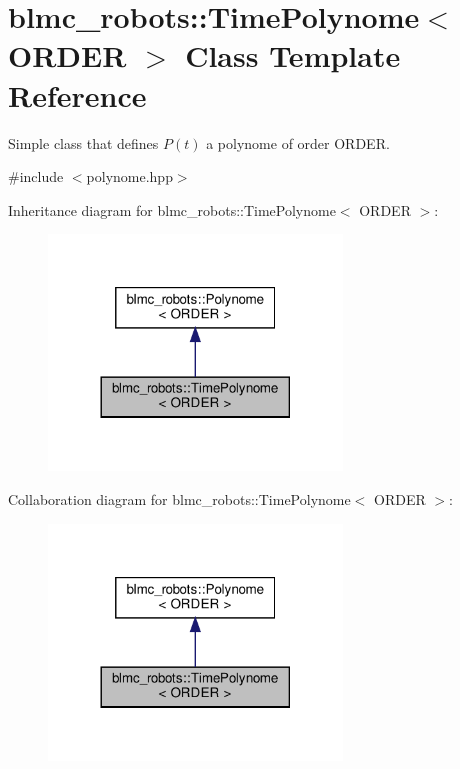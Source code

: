 \hypertarget{classblmc__robots_1_1TimePolynome}{}\section{blmc\+\_\+robots\+:\+:Time\+Polynome$<$ O\+R\+D\+ER $>$ Class Template Reference}
\label{classblmc__robots_1_1TimePolynome}


Simple class that defines $ P(t) $ a polynome of order O\+R\+D\+ER.  




{\ttfamily \#include $<$polynome.\+hpp$>$}



Inheritance diagram for blmc\+\_\+robots\+:\+:Time\+Polynome$<$ O\+R\+D\+ER $>$\+:
\nopagebreak
\begin{figure}[H]
\begin{center}
\leavevmode
\includegraphics[width=221pt]{classblmc__robots_1_1TimePolynome__inherit__graph}
\end{center}
\end{figure}


Collaboration diagram for blmc\+\_\+robots\+:\+:Time\+Polynome$<$ O\+R\+D\+ER $>$\+:
\nopagebreak
\begin{figure}[H]
\begin{center}
\leavevmode
\includegraphics[width=221pt]{classblmc__robots_1_1TimePolynome__coll__graph}
\end{center}
\end{figure}
